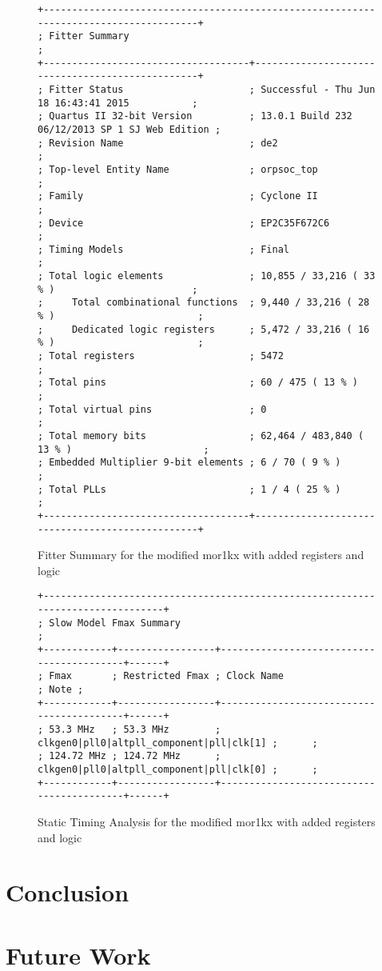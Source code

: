 \begin{figure}[t]
  \centering
  \footnotesize
  \begin{verbatim}
+--------------------------------------------------------------------------------------+
; Fitter Summary                                                                       ;
+------------------------------------+-------------------------------------------------+
; Fitter Status                      ; Successful - Thu Jun 18 16:43:41 2015           ;
; Quartus II 32-bit Version          ; 13.0.1 Build 232 06/12/2013 SP 1 SJ Web Edition ;
; Revision Name                      ; de2                                             ;
; Top-level Entity Name              ; orpsoc_top                                      ;
; Family                             ; Cyclone II                                      ;
; Device                             ; EP2C35F672C6                                    ;
; Timing Models                      ; Final                                           ;
; Total logic elements               ; 10,855 / 33,216 ( 33 % )                        ;
;     Total combinational functions  ; 9,440 / 33,216 ( 28 % )                         ;
;     Dedicated logic registers      ; 5,472 / 33,216 ( 16 % )                         ;
; Total registers                    ; 5472                                            ;
; Total pins                         ; 60 / 475 ( 13 % )                               ;
; Total virtual pins                 ; 0                                               ;
; Total memory bits                  ; 62,464 / 483,840 ( 13 % )                       ;
; Embedded Multiplier 9-bit elements ; 6 / 70 ( 9 % )                                  ;
; Total PLLs                         ; 1 / 4 ( 25 % )                                  ;
+------------------------------------+-------------------------------------------------+
  \end{verbatim}
  \caption{Fitter Summary for the modified mor1kx with added registers and logic}
  \label{fig:fit_after}
\end{figure}

\begin{figure}[t]
  \centering
  \footnotesize
  \begin{verbatim}
+--------------------------------------------------------------------------------+
; Slow Model Fmax Summary                                                        ;
+------------+-----------------+------------------------------------------+------+
; Fmax       ; Restricted Fmax ; Clock Name                               ; Note ;
+------------+-----------------+------------------------------------------+------+
; 53.3 MHz   ; 53.3 MHz        ; clkgen0|pll0|altpll_component|pll|clk[1] ;      ;
; 124.72 MHz ; 124.72 MHz      ; clkgen0|pll0|altpll_component|pll|clk[0] ;      ;
+------------+-----------------+------------------------------------------+------+
  \end{verbatim}
  \caption{Static Timing Analysis for the modified mor1kx with added registers and logic}
  \label{fig:sta_after}
\end{figure}


\section{Conclusion}
\section{Future Work}